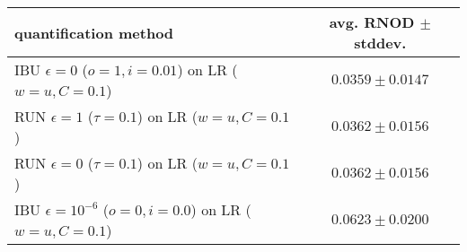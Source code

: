 \begin{tabular}{lc}
  \toprule
  quantification method & avg. RNOD $\pm$ stddev. \\
  \midrule
  IBU $\epsilon=0$ ($o=1, i=0.01$) on LR ($w=u, C=0.1$) & $\mathbf{0.0359 \pm 0.0147}$ \\
  RUN $\epsilon=1$ ($\tau=0.1$) on LR ($w=u, C=0.1$) & $\mathbf{0.0362 \pm 0.0156}$ \\
  RUN $\epsilon=0$ ($\tau=0.1$) on LR ($w=u, C=0.1$) & $\mathbf{0.0362 \pm 0.0156}$ \\
  IBU $\epsilon=10^{-6}$ ($o=0, i=0.0$) on LR ($w=u, C=0.1$) & $0.0623 \pm 0.0200$ \\
  \bottomrule
\end{tabular}
